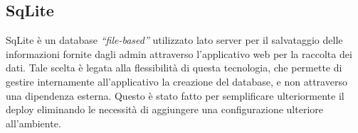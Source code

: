 \subsection{SqLite}\vspace{5mm}

	SqLite è un database \emph{“file-based”} utilizzato lato server per il salvataggio delle informazioni fornite dagli admin attraverso l’applicativo web per la raccolta dei dati. Tale scelta è legata alla flessibilità di questa tecnologia, che permette di gestire internamente all’applicativo la creazione del database, e non attraverso una dipendenza esterna. Questo è stato fatto per semplificare ulteriormente il deploy eliminando le necessità di aggiungere una configurazione ulteriore all’ambiente.\vspace{5mm}


